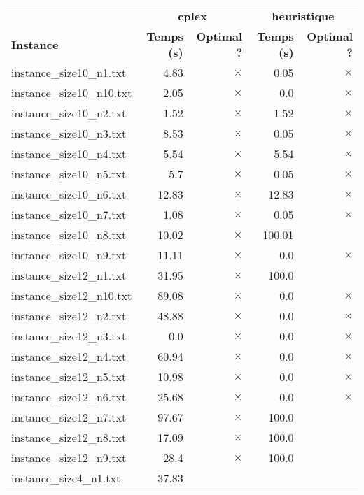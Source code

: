 \documentclass{article}
\begin{document}
\begin{center}
\renewcommand{\arraystretch}{1.4}
 \begin{tabular}{lrrrr}
	\hline
 & \multicolumn{2}{c}{\textbf{cplex}} & \multicolumn{2}{c}{\textbf{heuristique}}\\
\textbf{Instance}  & \textbf{Temps (s)} & \textbf{Optimal ?}  & \textbf{Temps (s)} & \textbf{Optimal ?} \\\hline

instance\_size10\_n1.txt & 4.83 & 
$\times$
 & 0.05 & 
$\times$
\\
instance\_size10\_n10.txt & 2.05 & 
$\times$
 & 0.0 & 
$\times$
\\
instance\_size10\_n2.txt & 1.52 & 
$\times$
 & 1.52 & 
$\times$
\\
instance\_size10\_n3.txt & 8.53 & 
$\times$
 & 0.05 & 
$\times$
\\
instance\_size10\_n4.txt & 5.54 & 
$\times$
 & 5.54 & 
$\times$
\\
instance\_size10\_n5.txt & 5.7 & 
$\times$
 & 0.05 & 
$\times$
\\
instance\_size10\_n6.txt & 12.83 & 
$\times$
 & 12.83 & 
$\times$
\\
instance\_size10\_n7.txt & 1.08 & 
$\times$
 & 0.05 & 
$\times$
\\
instance\_size10\_n8.txt & 10.02 & 
$\times$
 & 100.01 & 
\\
instance\_size10\_n9.txt & 11.11 & 
$\times$
 & 0.0 & 
$\times$
\\
instance\_size12\_n1.txt & 31.95 & 
$\times$
 & 100.0 & 
\\
instance\_size12\_n10.txt & 89.08 & 
$\times$
 & 0.0 & 
$\times$
\\
instance\_size12\_n2.txt & 48.88 & 
$\times$
 & 0.0 & 
$\times$
\\
instance\_size12\_n3.txt & 0.0 & 
$\times$
 & 0.0 & 
$\times$
\\
instance\_size12\_n4.txt & 60.94 & 
$\times$
 & 0.0 & 
$\times$
\\
instance\_size12\_n5.txt & 10.98 & 
$\times$
 & 0.0 & 
$\times$
\\
instance\_size12\_n6.txt & 25.68 & 
$\times$
 & 0.0 & 
$\times$
\\
instance\_size12\_n7.txt & 97.67 & 
$\times$
 & 100.0 & 
\\
instance\_size12\_n8.txt & 17.09 & 
$\times$
 & 100.0 & 
\\
instance\_size12\_n9.txt & 28.4 & 
$\times$
 & 100.0 & 
\\
instance\_size4\_n1.txt & 37.83 & 

\end{tabular}
\end{center}
\end{document}
